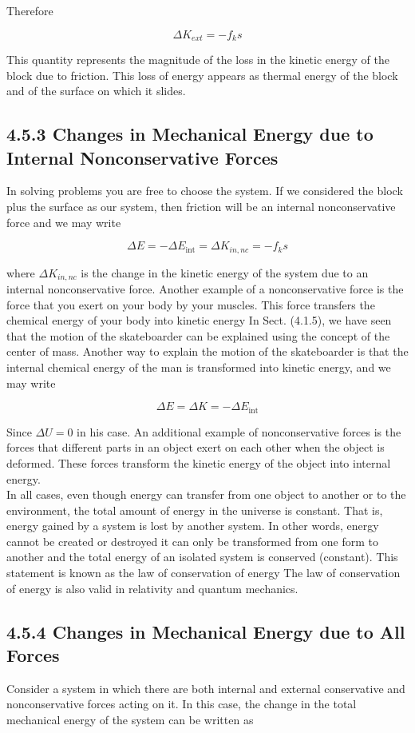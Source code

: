 \documentclass[10pt]{article}
\begin{document}
Therefore

$$
\Delta K_{e x t}=-f_{k} s
$$

This quantity represents the magnitude of the loss in the kinetic energy of the block due to friction. This loss of energy appears as thermal energy of the block and of the surface on which it slides.

\subsection*{4.5.3 Changes in Mechanical Energy due to Internal Nonconservative Forces}
In solving problems you are free to choose the system. If we considered the block plus the surface as our system, then friction will be an internal nonconservative force and we may write

$$
\Delta E=-\Delta E_{\mathrm{int}}=\Delta K_{i n, n c}=-f_{k} s
$$

where $\Delta K_{i n, n c}$ is the change in the kinetic energy of the system due to an internal nonconservative force. Another example of a nonconservative force is the force that you exert on your body by your muscles. This force transfers the chemical energy of your body into kinetic energy In Sect. (4.1.5), we have seen that the motion of the skateboarder can be explained using the concept of the center of mass. Another way to explain the motion of the skateboarder is that the internal chemical energy of the man is transformed into kinetic energy, and we may write

$$
\Delta E=\Delta K=-\Delta E_{\mathrm{int}}
$$

Since $\Delta U=0$ in his case. An additional example of nonconservative forces is the forces that different parts in an object exert on each other when the object is deformed. These forces transform the kinetic energy of the object into internal energy.\\
In all cases, even though energy can transfer from one object to another or to the environment, the total amount of energy in the universe is constant. That is, energy gained by a system is lost by another system. In other words, energy cannot be created or destroyed it can only be transformed from one form to another and the total energy of an isolated system is conserved (constant). This statement is known as the law of conservation of energy The law of conservation of energy is also valid in relativity and quantum mechanics.

\subsection*{4.5.4 Changes in Mechanical Energy due to All Forces}
Consider a system in which there are both internal and external conservative and nonconservative forces acting on it. In this case, the change in the total mechanical energy of the system can be written as
\end{document}
